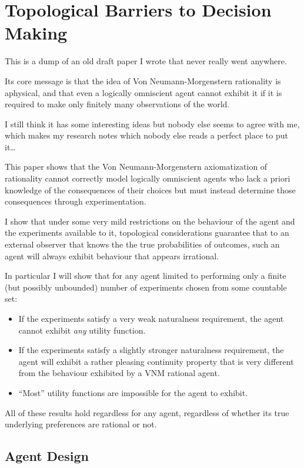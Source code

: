 \chapter{Topological Barriers to Decision Making}

This is a dump of an old draft paper I wrote that never really went anywhere.

Its core message is that the idea of Von Neumann-Morgenstern rationality is aphysical,
and that even a logically omniscient agent cannot exhibit it if it is required to make only finitely many observations of the world.

I still think it has some interesting ideas but nobody else seems to agree with me,
which makes my research notes which nobody else reads a perfect place to put it\ldots

This paper shows that the Von Neumann-Morgenstern axiomatization of rationality
cannot correctly model logically omniscient agents who lack a priori
knowledge of the consequences of their choices but must instead determine
those consequences through experimentation.

I show that under some very mild restrictions on the behaviour of the agent
and the experiments available to it, topological considerations guarantee
that to an external observer that knows the the true probabilities of outcomes,
such an agent will always exhibit behaviour that appears irrational.

In particular I will show that for any agent limited to performing only a finite
(but possibly unbounded) number of experiments chosen from some countable set:

\begin{itemize}
\item If the experiments satisfy a very weak naturalness requirement, the agent
cannot exhibit \textit{any} utility function.
\item If the experiments satisfy a slightly stronger naturalness requirement,
the agent will exhibit a rather
pleasing continuity property that is very different from the behaviour exhibited
by a VNM rational agent.
\item ``Most'' utility functions are impossible for the agent to exhibit.
\end{itemize}

All of these results hold regardless for any agent, regardless of whether
its true underlying preferences are rational or not.

\section{Agent Design}

